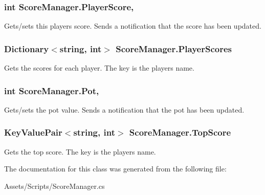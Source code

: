 \subsubsection[{\texorpdfstring{Player\+Score}{PlayerScore}}]{\setlength{\rightskip}{0pt plus 5cm}int Score\+Manager.\+Player\+Score\hspace{0.3cm}{\ttfamily [get]}, {\ttfamily [set]}}\hypertarget{class_score_manager_a1a7ae6889437a8e47fac4ca2036149b3}{}\label{class_score_manager_a1a7ae6889437a8e47fac4ca2036149b3}


Gets/sets this player\textquotesingle{}s score. Sends a notification that the score has been updated. 

\subsubsection[{\texorpdfstring{Player\+Scores}{PlayerScores}}]{\setlength{\rightskip}{0pt plus 5cm}Dictionary$<$string, int$>$ Score\+Manager.\+Player\+Scores\hspace{0.3cm}{\ttfamily [get]}}\hypertarget{class_score_manager_a160ee3a7dbcadcca8a0c623719394681}{}\label{class_score_manager_a160ee3a7dbcadcca8a0c623719394681}


Gets the scores for each player. The key is the player\textquotesingle{}s name. 

\subsubsection[{\texorpdfstring{Pot}{Pot}}]{\setlength{\rightskip}{0pt plus 5cm}int Score\+Manager.\+Pot\hspace{0.3cm}{\ttfamily [get]}, {\ttfamily [set]}}\hypertarget{class_score_manager_a4e64c104c582dbe98703bfaa2a6bf196}{}\label{class_score_manager_a4e64c104c582dbe98703bfaa2a6bf196}


Gets/sets the pot value. Sends a notification that the pot has been updated. 

\subsubsection[{\texorpdfstring{Top\+Score}{TopScore}}]{\setlength{\rightskip}{0pt plus 5cm}Key\+Value\+Pair$<$string, int$>$ Score\+Manager.\+Top\+Score\hspace{0.3cm}{\ttfamily [get]}}\hypertarget{class_score_manager_aea653edd704e7a996e77ac55f23a9782}{}\label{class_score_manager_aea653edd704e7a996e77ac55f23a9782}


Gets the top score. The key is the player\textquotesingle{}s name. 



The documentation for this class was generated from the following file\+:\begin{DoxyCompactItemize}
\item 
Assets/\+Scripts/Score\+Manager.\+cs\end{DoxyCompactItemize}
